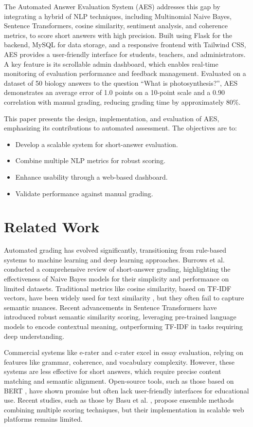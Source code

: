 \documentclass[conference]{IEEEtran}
\begin{document}
The Automated Answer Evaluation System (AES) addresses this gap by integrating a hybrid of NLP techniques, including Multinomial Naive Bayes, Sentence Transformers, cosine similarity, sentiment analysis, and coherence metrics, to score short answers with high precision. Built using Flask for the backend, MySQL for data storage, and a responsive frontend with Tailwind CSS, AES provides a user-friendly interface for students, teachers, and administrators. A key feature is its scrollable admin dashboard, which enables real-time monitoring of evaluation performance and feedback management. Evaluated on a dataset of 50 biology answers to the question ``What is photosynthesis?'', AES demonstrates an average error of 1.0 points on a 10-point scale and a 0.90 correlation with manual grading, reducing grading time by approximately 80\%.

This paper presents the design, implementation, and evaluation of AES, emphasizing its contributions to automated assessment. The objectives are to:
\begin{itemize}
    \item Develop a scalable system for short-answer evaluation.
    \item Combine multiple NLP metrics for robust scoring.
    \item Enhance usability through a web-based dashboard.
    \item Validate performance against manual grading.
\end{itemize}

\section{Related Work}
Automated grading has evolved significantly, transitioning from rule-based systems to machine learning and deep learning approaches. Burrows et al. \cite{burrows2015} conducted a comprehensive review of short-answer grading, highlighting the effectiveness of Naive Bayes models for their simplicity and performance on limited datasets. Traditional metrics like cosine similarity, based on TF-IDF vectors, have been widely used for text similarity \cite{landauer1998}, but they often fail to capture semantic nuances. Recent advancements in Sentence Transformers \cite{reimers2019} have introduced robust semantic similarity scoring, leveraging pre-trained language models to encode contextual meaning, outperforming TF-IDF in tasks requiring deep understanding.

Commercial systems like e-rater \cite{attali2006} and c-rater \cite{shermis2013} excel in essay evaluation, relying on features like grammar, coherence, and vocabulary complexity. However, these systems are less effective for short answers, which require precise content matching and semantic alignment. Open-source tools, such as those based on BERT \cite{devlin2019}, have shown promise but often lack user-friendly interfaces for educational use. Recent studies, such as those by Basu et al. \cite{basu2013}, propose ensemble methods combining multiple scoring techniques, but their implementation in scalable web platforms remains limited.
\end{document}
